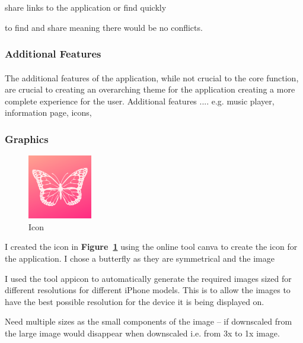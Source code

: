 \documentclass[11pt]{article}
\begin{document}
        
        share links to the application or find quickly 
        
        to find and share meaning there would be no conflicts.

        \subsubsection{Additional Features}
        \paragraph{}
        The additional features of the application, while not crucial to the core function, are crucial to creating an overarching theme for the application creating a more complete experience for the user.    Additional features .... e.g. music player, information page, icons, 
        
         \subsubsection{Graphics}
    
        \begin{figure}
                        \centering
                        \includegraphics[width=0.25\textwidth]{KiriZen/icon.png}
                        \caption{Icon}
                        \label{fig:icon}
                    \end{figure}
            I created the icon in \textbf{Figure~\ref{fig:icon}} using the online tool canva %
            to create the icon for the application. I chose a butterfly as they are symmetrical and the image
            
            I used the tool appicon %
            to automatically generate the required images sized for different resolutions for different iPhone models. This is to allow the images to have the best possible resolution for the device it is being displayed on.  
            
            Need multiple sizes as the small components of the image – if downscaled from the large image would disappear when downscaled i.e. from 3x to 1x image. 
        
\end{document}
